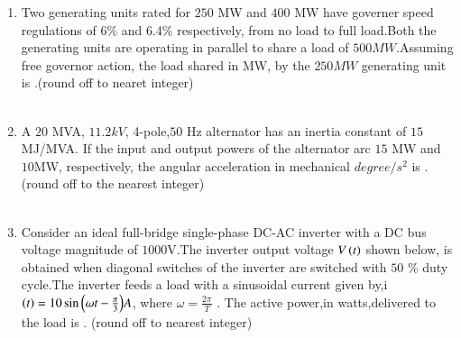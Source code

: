 \documentclass[journal]{IEEEtran}
\begin{document}
\begin {enumerate}
\item Two generating units rated for $250$ MW and $400$ MW have governer speed regulations of 6\% and 6.4\%
respectively, from no load to full load.Both the generating units are operating in parallel to share a load of $500 MW$.Assuming free governor action, the load shared in MW, by the $250 MW$ generating unit is \underline{\hspace{2cm}}.(round off to nearet integer) \\ \\

\item A $20$ MVA, $11.2 kV$, 4-pole,$50$ Hz alternator has an inertia constant of $15$ MJ/MVA. If the input and output powers of the alternator arc $15$ MW and $10$MW, respectively, the angular acceleration in mechanical $degree/s^2$  is \underline{\hspace{2cm}}. (round off to the nearest integer)  \\ \\

\item Consider an ideal full-bridge single-phase DC-AC inverter with a DC bus voltage magnitude of $1000$V.The inverter output voltage $V\left(t\right)$ shown below, is obtained when diagonal switches of the inverter are switched with $50$ \% duty cycle.The inverter feeds a load with a sinusoidal current
given by,i$\left(t\right)=10\sin{\ensuremath{\left({\omega}t-\frac{\pi}{3}\right)}}A$, where  $\omega = \frac{2\pi}{T}$ . The active power,in watts,delivered to the load is \underline{\hspace{2cm}}. (round off to nearest integer) \\ \\
\begin{figure}[!ht]
\centering
{}%
\end{figure}


\end{enumerate}
\end{document}
